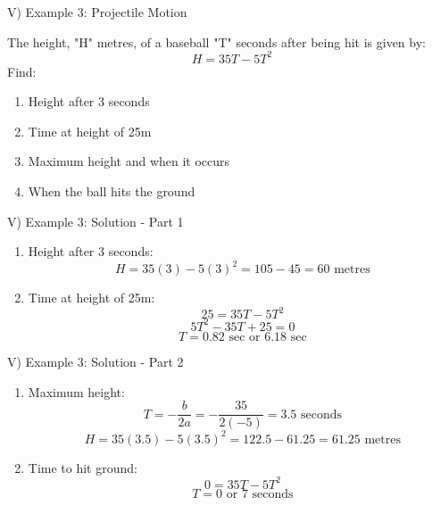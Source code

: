\documentclass[aspectratio=169]{beamer}
\begin{document}
\begin{frame}{V) Example 3: Projectile Motion}
    \begin{tcolorbox}[colback=lightgray,colframe=primary,title=Problem]
        \footnotesize
        The height, "H" metres, of a baseball "T" seconds after being hit is given by:
        \[H = 35T - 5T^2\]
        Find:
        \begin{enumerate}
            \item Height after 3 seconds
            \item Time at height of 25m
            \item Maximum height and when it occurs
            \item When the ball hits the ground
        \end{enumerate}
    \end{tcolorbox}
\end{frame}

\begin{frame}{V) Example 3: Solution - Part 1}
    \begin{tcolorbox}[colback=lightgray,colframe=accent,title=Solution - Part 1]
        \footnotesize
        \begin{enumerate}
            \item Height after 3 seconds:
            \[H = 35(3) - 5(3)^2 = 105 - 45 = 60 \text{ metres}\]
            
            \item Time at height of 25m:
            \[25 = 35T - 5T^2\]
            \[5T^2 - 35T + 25 = 0\]
            \[T = 0.82 \text{ sec or } 6.18 \text{ sec}\]
        \end{enumerate}
    \end{tcolorbox}
\end{frame}

\begin{frame}{V) Example 3: Solution - Part 2}
    \begin{tcolorbox}[colback=lightgray,colframe=accent,title=Solution - Part 2]
        \footnotesize
        \begin{enumerate}
            \item Maximum height:
            \[T = -\frac{b}{2a} = -\frac{35}{2(-5)} = 3.5 \text{ seconds}\]
            \[H = 35(3.5) - 5(3.5)^2 = 122.5 - 61.25 = 61.25 \text{ metres}\]
            
            \item Time to hit ground:
            \[0 = 35T - 5T^2\]
            \[T = 0 \text{ or } 7 \text{ seconds}\]
        \end{enumerate}
    \end{tcolorbox}
\end{frame}
\end{document}
